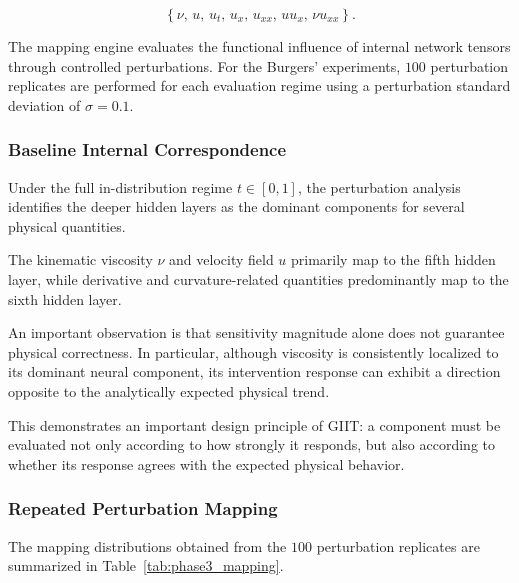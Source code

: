 \documentclass[12pt,singleside,a4paper]{article}
\begin{document}
\begin{equation}
    \left\{
    \nu,\,
    u,\,
    u_t,\,
    u_x,\,
    u_{xx},\,
    uu_x,\,
    \nu u_{xx}
    \right\}.
\end{equation}

The mapping engine evaluates the functional influence of internal
network tensors through controlled perturbations. For the Burgers'
experiments, $100$ perturbation replicates are performed for each
evaluation regime using a perturbation standard deviation of
$\sigma=0.1$.


\subsubsection{Baseline Internal Correspondence}

Under the full in-distribution regime $t\in[0,1]$, the perturbation
analysis identifies the deeper hidden layers as the dominant
components for several physical quantities.

The kinematic viscosity $\nu$ and velocity field $u$ primarily map to
the fifth hidden layer, while derivative and curvature-related
quantities predominantly map to the sixth hidden layer.

An important observation is that sensitivity magnitude alone does not
guarantee physical correctness. In particular, although viscosity is
consistently localized to its dominant neural component, its
intervention response can exhibit a direction opposite to the
analytically expected physical trend.

This demonstrates an important design principle of GIIT: a component
must be evaluated not only according to how strongly it responds, but
also according to whether its response agrees with the expected
physical behavior.


\subsubsection{Repeated Perturbation Mapping}

The mapping distributions obtained from the $100$ perturbation
replicates are summarized in Table~\ref{tab:phase3_mapping}.
\end{document}
